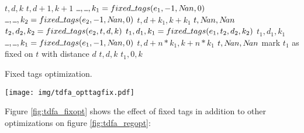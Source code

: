 \documentclass[]{article}
\let\oldnl\nl%
\newcommand{\nonl}{\renewcommand{\nl}{\let\nl\oldnl}}%
\newcommand{\Xund}{\rule{.5em}{.5pt}}
\begin{document}
\begin{multicols}{2}
\begin{algorithm}[H] \DontPrintSemicolon {} 
\small

\Indm

\nonl\Fn {$\underline{fixed \Xund tags \big( e, t, d, k \big)} \smallskip$} {
     {
        \Return $t, d, k$
    }
    \BlankLine
     {
        \Return $t, d + 1, k + 1$
    }
    \BlankLine
     {
        $\Xund, \Xund, k_1 = fixed \Xund tags(e_1, \nobasetag, \nan, 0)$ \;
        $\Xund, \Xund, k_2 = fixed \Xund tags(e_2, \nobasetag, \nan, 0)$ \;
         {
            \Return $t, d + k_1, k + k_1$
        }
        \Return $t, N\!an, N\!an$
    }
    \BlankLine
     {
        $t_2, d_2, k_2 = fixed \Xund tags(e_2, t, d, k)$ \;
        $t_1, d_1, k_1 = fixed \Xund tags(e_1, t_2, d_2, k_2)$ \;
        \Return $t_1, d_1, k_1$
    }
    \BlankLine
     {
        $\Xund, \Xund, k_1 = fixed \Xund tags(e_1, \nobasetag, \nan, 0)$ \;
         {
            \Return $t, d + n * k_1, k + n * k_1$
        }
        \Return $t, N\!an, N\!an$
    }
    \BlankLine
     {
         {
            mark $t_1$ as fixed on $t$ with distance $d$ \;
            \Return $t, d, k$
        }
        \Return $t_1, 0, k$
    }
}

\vspace{1em}
\caption{Fixed tags optimization.}\label{alg_fixed_tags}
\end{algorithm}
\vspace{2em}

\columnbreak
\Indm\Indm

\texttt{[image: img/tdfa\_opttagfix.pdf]}
\vspace{1em}
\label{fig:tdfa_fixopt}

\end{multicols}
\medskip

Figure \ref{fig:tdfa_fixopt} shows the effect of fixed tags in addition to other optimizations on figure \ref{fig:tdfa_regopt}:
\medskip
\end{document}
